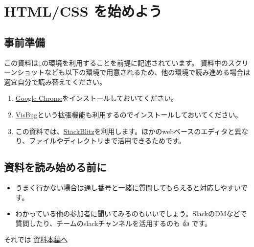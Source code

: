 \section{HTML/CSS
を始めよう}\label{htmlcss-ux3092ux59cbux3081ux3088ux3046}

\subsection{事前準備}\label{ux4e8bux524dux6e96ux5099}

この資料は↓の環境を利用することを前提に記述されています。
資料中のスクリーンショットなども以下の環境で用意されるため、他の環境で読み進める場合は適宜自分で読み替えてください。

\begin{enumerate}
\def\labelenumi{\arabic{enumi}.}
\tightlist
\item
  \href{https://www.google.com/intl/ja/chrome/gsem/download/}{Google
  Chrome}をインストールしておいてください。
\item
  \href{https://chrome.google.com/webstore/detail/visbug/cdockenadnadldjbbgcallicgledbeoc?hl=ja}{VisBug}という拡張機能も利用するのでインストールしておいてください。
\item
  この資料では、\href{https://stackblitz.com/?starters=vanilla}{StackBlitz}を利用します。ほかのwebベースのエディタと異なり、ファイルやディレクトリまで活用できるためです。
\end{enumerate}

\subsection{資料を読み始める前に}\label{ux8cc7ux6599ux3092ux8aadux307fux59cbux3081ux308bux524dux306b}

\begin{itemize}
\tightlist
\item
  うまく行かない場合は通し番号と一緒に質問してもらえると対応しやすいです。
\item
  わかっている他の参加者に聞いてみるのもいいでしょう。SlackのDMなどで質問したり、チームのslackチャンネルを活用するのも
  👍 です。
\end{itemize}

それでは \href{DOCS.md}{資料本編へ}

